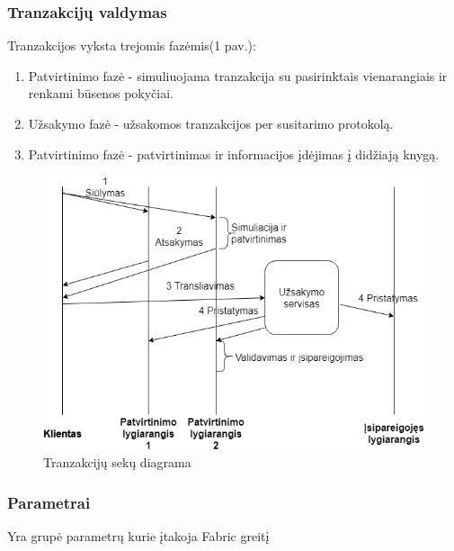 \documentclass{VUMIFPSkursinis}
\begin{document}
		\subsubsection{Tranzakcijų valdymas}
			Tranzakcijos vyksta trejomis fazėmis(1 pav.):
			\begin{enumerate}
				\item{Patvirtinimo fazė - simuliuojama tranzakcija su pasirinktais vienarangiais ir renkami būsenos pokyčiai.}
				\item{Užsakymo fazė - užsakomos tranzakcijos per susitarimo protokolą.}
				\item{Patvirtinimo fazė - patvirtinimas ir informacijos įdėjimas į didžiają knygą.}
			\end{enumerate}

			\begin{figure}[H]
			    \centering
			    \includegraphics[scale=0.5]{img/MLP}
			    \caption{Tranzakcijų sekų diagrama}   %
			    \label{img:mlp}
			\end{figure}
		\subsubsection{Parametrai}
			Yra grupė parametrų \cite{IMBResearch} kurie įtakoja Fabric greitį 
			
\end{document}

